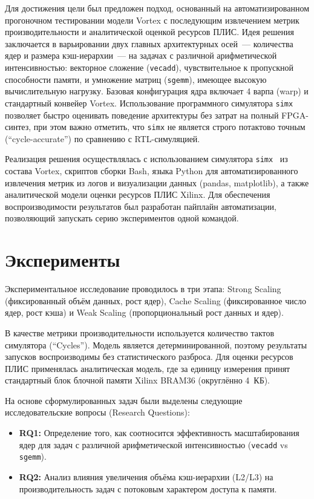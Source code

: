 \documentclass[a4paper]{article}
\begin{document}
Для достижения цели был предложен подход, основанный на автоматизированном прогоночном тестировании модели Vortex с последующим извлечением метрик производительности и аналитической оценкой ресурсов ПЛИС. Идея решения заключается в варьировании двух главных архитектурных осей~--- количества ядер и размера кэш-иерархии~--- на задачах с различной арифметической интенсивностью: векторное сложение (\texttt{vecadd}), чувствительное к пропускной способности памяти, и умножение матриц (\texttt{sgemm}), имеющее высокую вычислительную нагрузку. Базовая конфигурация ядра включает 4 варпа (warp) и стандартный конвейер Vortex. Использование программного симулятора \texttt{simx}~\cite{vortex_simx} позволяет быстро оценивать поведение архитектуры без затрат на полный FPGA-синтез, при этом важно отметить, что \texttt{simx} не является строго потактово точным (\enquote{cycle-accurate}) по сравнению с RTL-симуляцией.

Реализация решения осуществлялась с использованием симулятора \texttt{simx}~\cite{vortex_simx} из состава Vortex, скриптов сборки Bash, языка Python для автоматизированного извлечения метрик из логов и визуализации данных (pandas, matplotlib), а также аналитической модели оценки ресурсов ПЛИС Xilinx. Для обеспечения воспроизводимости результатов был разработан пайплайн автоматизации, позволяющий запускать серию экспериментов одной командой.

\section{Эксперименты}

Экспериментальное исследование проводилось в три этапа: Strong Scaling (фиксированный объём данных, рост ядер), Cache Scaling (фиксированное число ядер, рост кэша) и Weak Scaling (пропорциональный рост данных и ядер). 

В качестве метрики производительности используется количество тактов симулятора (\enquote{Cycles}). Модель является детерминированной, поэтому результаты запусков воспроизводимы без статистического разброса. Для оценки ресурсов ПЛИС применялась аналитическая модель, где за единицу измерения принят стандартный блок блочной памяти Xilinx BRAM36 (округлённо 4~КБ).

На основе сформулированных задач были выделены следующие исследовательские вопросы (Research Questions):
\begin{itemize}
    \item \textbf{RQ1:} Определение того, как соотносится эффективность масштабирования ядер для задач с различной арифметической интенсивностью (\texttt{vecadd} vs \texttt{sgemm}).
    \item \textbf{RQ2:} Анализ влияния увеличения объёма кэш-иерархии (L2/L3) на производительность задач с потоковым характером доступа к памяти.
\end{itemize}
\end{document}

